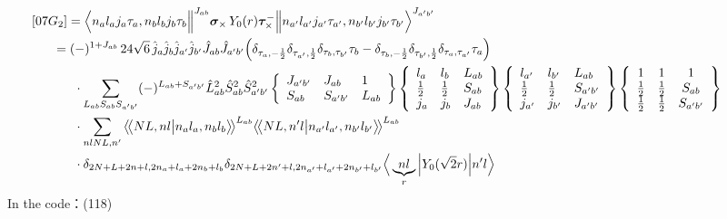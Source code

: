 \documentclass[master]{shnuthesis}
\newcommand{\llangle}{\big\langle\!\big\langle}
\newcommand{\rrangle}{\big\rangle\!\big\rangle}
\newcommand{\ap}{a^\prime}
\newcommand{\bp}{b^\prime}
\newcommand{\il}{\!\!\!\!\!\!\!\!\!\!}
\newcommand{\ii}{\!\!\!\!\!\!\!\!\!\!\!\!\!\!\!\!\!\!\!\!}
\begin{document}
\begin{align}
    &\ii [07G_2] = \Big\langle n_a l_a j_a \tau_a, n_b l_b j_b \tau_b \Big\|^{J_{ab}} \bm{\sigma}_\times \,Y_0(r) \bm{\tau}_\times^- \Big\| n_{\ap} l_{\ap} j_{\ap} \tau_{\ap}, n_{\bp} l_{\bp} j_{\bp} \tau_{\bp} \Big\rangle^{J_{\ap \bp}} \\
    &\il = (-)^{1+J_{ab}}\,24\sqrt{6}\,\hat{j}_a\hat{j}_b\hat{j}_{\ap}\hat{j}_{\bp}\hat{J}_{ab}\hat{J}_{\ap\bp} \Big( \delta_{\tau_a,-\frac{1}{2}}\delta_{\tau_{\ap},\frac{1}{2}}\delta_{\tau_b,\tau_{\bp}}\tau_b - \delta_{\tau_b,-\frac{1}{2}}\delta_{\tau_{\bp},\frac{1}{2}}\delta_{\tau_a,\tau_{\ap}}\tau_a \Big) \notag\\
    & \cdot \sum_{L_{ab}S_{ab}S_{\ap\bp}} (-)^{L_{ab}+S_{\ap\bp}} \hat{L}_{ab}^2\hat{S}_{ab}^2\hat{S}_{\ap\bp}^2  \left\{\begin{array}{lll} J_{\ap\bp} & J_{ab} & 1 \\ S_{ab} & S_{\ap\bp} & L_{ab} \end{array}\right\}  \left\{\begin{array}{lll}l_{a} & l_{b} & L_{ab} \\ \frac{1}{2} & \frac{1}{2} & S_{ab} \\j_{a} & j_{b} & J_{ab} \end{array}\right\} \left\{\begin{array}{lll}l_{\ap} & l_{\bp} & L_{ab} \\ \frac{1}{2} & \frac{1}{2} & S_{\ap\bp} \\j_{\ap} & j_{\bp} & J_{\ap\bp} \end{array}\right\}  \left\{\begin{array}{ccc} 1 & 1 & 1 \\ \frac{1}{2} & \frac{1}{2} & S_{ab} \\ \frac{1}{2} & \frac{1}{2} & S_{\ap\bp} \end{array}\right\}  \notag \\
    & \cdot \sum_{nlNL,n^\prime} \llangle N L, n l \big| n_{a} l_{a}, n_{b} l_{b} \rrangle^{L_{ab}} \llangle N L, n^\prime l \big| n_{a^\prime} l_{a^\prime}, n_{b^\prime} l_{b^\prime} \rrangle^{L_{ab}} \notag\\
    & \cdot \delta_{2N+L+2n+l,2n_a+l_a+2n_b+l_b}\delta_{2N+L+2n^\prime+l,2n_{a^\prime}+l_{a^\prime}+2n_{b^\prime}+l_{b^\prime}}  \Big\langle \underbrace{n l}_{r} \Big| Y_0(\sqrt{2}r) \Big| n^\prime l \Big\rangle
\end{align}
In the code：(118)
\end{document}
